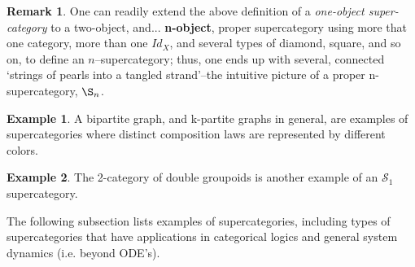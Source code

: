\documentclass[12pt]{article}
\theoremstyle{plain}
\theoremstyle{definition}
\newtheorem{example}{Example}[section]
\newtheorem{remark}{Remark}[section]
\numberwithin{equation}{section}
\begin{document}
\begin{remark}
One can readily extend the above definition of a \emph{one-object super-category} to a two-object, and... 
\textbf{n-object}, proper supercategory using more that one category, more than one $Id_X$, and several types of diamond, square, and so on, to define an $n$--supercategory; thus, one ends up with several, connected `strings of pearls into a tangled strand'--the intuitive picture of a proper n-supercategory, $\S_n$. 
\end{remark}
\begin{example}
A bipartite graph, and k-partite graphs in general, are examples of supercategories where
distinct composition laws are represented by different colors. 
\end{example}

\begin{example}
The 2-category of double groupoids is another example of an $\mathcal{S}_1$ supercategory.
\end{example}

The following subsection lists examples of supercategories, including types of supercategories that
have applications in categorical logics and general system dynamics (i.e. beyond ODE's).
\end{document}
